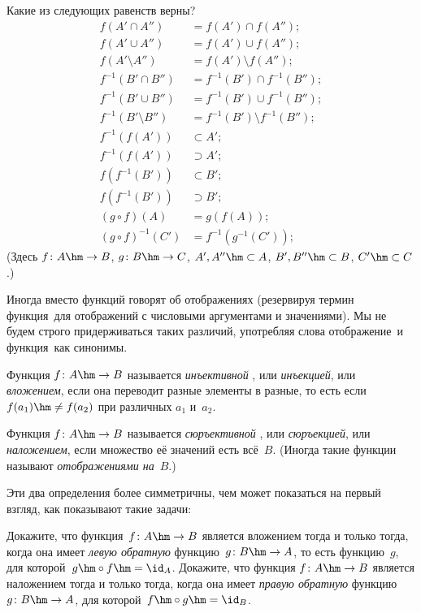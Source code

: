\begin{problem}
Какие из следующих равенств верны?
        \begin{align*}
f(A' \cap A'') &= f(A') \cap f(A'');\\
f(A' \cup A'') &= f(A') \cup f(A'');\\
f(A' \setminus A'') &= f(A') \setminus f(A'');\\
f^{-1}(B' \cap B'') &= f^{-1}(B') \cap f^{-1}(B'');\\
f^{-1}(B' \cup B'') &= f^{-1}(B') \cup f^{-1}(B'');\\
f^{-1}(B' \setminus B'') &= f^{-1}(B') \setminus f^{-1}(B'');\\
f^{-1}(f(A'))&\subset A';\\
f^{-1}(f(A'))&\supset A';\\
f(f^{-1}(B') )&\subset B';\\
f(f^{-1}(B') )&\supset B';\\
(g\circ  f)(A)&=g(f(A));\\
(g\circ f)^{-1}(C')&= f^{-1}(g^{-1}(C'));
        \end{align*}
(Здесь $f\colon A\hm\to B$, $g\colon B\hm\to C$, $A',A''\hm\subset A$,
$B',B''\hm\subset B$, $C'\hm\subset C$.)
\end{problem}
\problskip

Иногда вместо функций говорят об отображениях
(резервируя термин
 функция\ для отображений с числовыми аргументами и
значениями). Мы не будем строго придерживаться таких различий,
употребляя слова  отображение\ и  функция\ как
синонимы.

        \label{injection}%
Функция $f\colon A\hm\to B$ называется \emph{инъективной}%
, или
\emph{инъекцией}, или \emph{вложением},
если она переводит
разные элементы в разные, то есть если $f(a_1)\hm\neq f(a_2)$
при различных $a_1$ и~$a_2$.

        \label{surjection}%
Функция $f\colon A\hm\to B$ называется \emph{сюръективной}%
, или
\emph{сюръекцией}, или \emph{наложением},
если множество её значений есть
всё~$B$. (Иногда такие функции называют \emph{отображениями
на}~$B$.)

Эти два определения более симметричны, чем может показаться
на первый взгляд, как показывают такие задачи:

\begin{problem}
Докажите, что функция~$f\colon A\hm\to B$ является вложением
тогда и только тогда, когда она имеет \emph{левую обратную}
функцию~$g\colon B\hm\to A$, то есть функцию~$g$,
для которой~$g\hm\circ f \hm= \id_A$.
Докажите, что функция $f\colon A\hm\to B$ является наложением
тогда и только тогда, когда она имеет \emph{правую обратную}
функцию~$g\colon B\hm\to A$, для которой~$f\hm\circ g \hm= \id_B$.
\end{problem}

